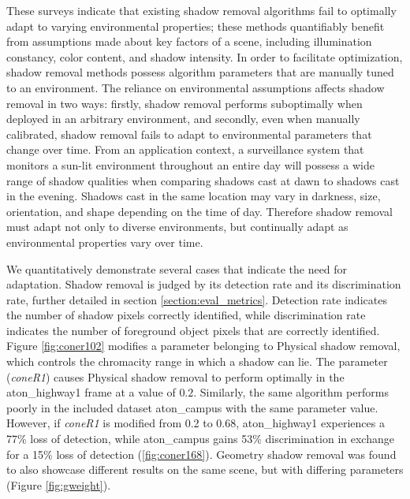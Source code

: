 These surveys indicate that existing shadow removal algorithms fail to optimally adapt to varying environmental properties; these methods quantifiably benefit from assumptions made about key factors of a scene, including illumination constancy, color content, and shadow intensity. In order to facilitate optimization, shadow removal methods possess algorithm parameters that are manually tuned to an environment. The reliance on environmental assumptions affects shadow removal in two ways: firstly, shadow removal performs suboptimally when deployed in an arbitrary environment, and secondly, even when manually calibrated, shadow removal fails to adapt to environmental parameters that change over time. From an application context, a surveillance system that monitors a sun-lit environment throughout an entire day will possess a wide range of shadow qualities when comparing shadows cast at dawn to shadows cast in the evening. Shadows cast in the same location may vary in darkness, size, orientation, and shape depending on the time of day. Therefore shadow removal must adapt not only to diverse environments, but continually adapt as environmental properties vary over time.

We quantitatively demonstrate several cases that indicate the need for adaptation. Shadow removal is judged by its detection rate and its discrimination rate, further detailed in section \ref{section:eval_metrics}. Detection rate indicates the number of shadow pixels correctly identified, while discrimination rate indicates the number of foreground object pixels that are correctly identified. Figure \ref{fig:coner102} modifies a parameter belonging to Physical shadow removal, which controls the chromacity range in which a shadow can lie. The parameter (\textit{coneR1}) causes Physical shadow removal to perform optimally in the aton\_highway1 frame at a value of $0.2$. Similarly, the same algorithm performs poorly in the included dataset aton\_campus with the same parameter value. However, if \textit{coneR1} is modified from 0.2 to 0.68, aton\_highway1 experiences a 77\% loss of detection, while aton\_campus gains 53\% discrimination in exchange for a 15\% loss of detection (\ref{fig:coner168}). Geometry shadow removal was found to also showcase different results on the same scene, but with differing parameters (Figure \ref{fig:gweight}). 

